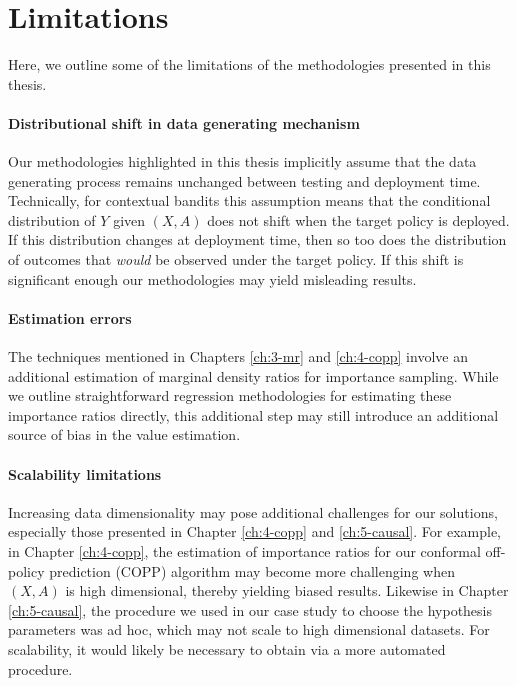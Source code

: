 \section{Limitations}
Here, we outline some of the limitations of the methodologies presented in this thesis. 

\paragraph*{Distributional shift in data generating mechanism}
Our methodologies highlighted in this thesis implicitly assume that the data generating process remains unchanged between testing and deployment time. 
Technically, for contextual bandits this assumption means that the conditional distribution of $Y$ given $(X, A)$ does not shift when the target policy is deployed. 
If this distribution changes at deployment time, then so too does the distribution of outcomes that \emph{would} be observed under the target policy. 
If this shift is significant enough our methodologies may yield misleading results.  

\paragraph*{Estimation errors}
The techniques mentioned in Chapters \ref*{ch:3-mr} and \ref*{ch:4-copp} involve an additional estimation of marginal density ratios for importance sampling. 
While we outline straightforward regression methodologies for estimating these importance ratios directly, this additional step may still introduce an additional source of bias in the value estimation. 

\paragraph*{Scalability limitations}
Increasing data dimensionality may pose additional challenges for our solutions, especially those presented in Chapter \ref*{ch:4-copp} and \ref*{ch:5-causal}. 
For example, in Chapter \ref*{ch:4-copp}, the estimation of importance ratios for our conformal off-policy prediction (COPP) algorithm may become more challenging when $(X, A)$ is high dimensional, thereby yielding biased results.
Likewise in Chapter \ref*{ch:5-causal}, the procedure we used in our case study to choose the hypothesis parameters was ad hoc, which may not scale to high dimensional datasets.
For scalability, it would likely be necessary to obtain via a more automated procedure.

